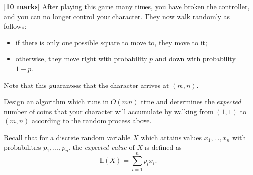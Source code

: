\documentclass{article}
\begin{document}
\begin{Question}
\clearpage
\begin{Subquestion}
\textbf{[10 marks]} After playing this game many times, you have broken the controller, and you can no longer control your character. They now walk randomly as follows:
\begin{itemize}
    \item if there is only one possible square to move to, they move to it;
    \item otherwise, they move right with probability $p$ and down with probability $1-p$.
\end{itemize}
Note that this guarantees that the character arrives at $(m,n)$.

Design an algorithm which runs in $O(mn)$ time and determines the \emph{expected} number of coins that your character will accumulate by walking from $(1,1)$ to $(m,n)$ according to the random process above.

Recall that for a discrete random variable $X$ which attains values $x_1, \ldots, x_n$ with probabilities $p_1, \ldots, p_n$, the \emph{expected value} of $X$ is defined as \[ \mathbb{E}(X) = \sum_{i=1}^n p_i x_i. \]


\end{Subquestion}
\end{Question}
\end{document}
